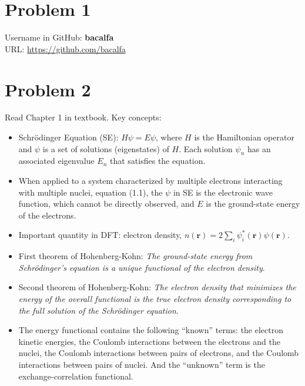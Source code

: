 \documentclass[letter, 12pt]{article}
\begin{document}
\section*{Problem 1}

Username in GitHub: \textbf{bacalfa}\\
URL: \url{https://github.com/bacalfa}




\section*{Problem 2}

Read Chapter 1 in textbook. Key concepts:
\begin{itemize}
	\item Schr\"odinger Equation (SE): $H\psi = E\psi$, where $H$ is the Hamiltonian operator and $\psi$ is a set of solutions (eigenstates) of $H$. Each solution $\psi_n$ has an associated eigenvalue $E_n$ that satisfies the equation.
	
	\item When applied to a system characterized by multiple electrons interacting with multiple nuclei, equation (1.1), the $\psi$ in SE is the electronic wave function, which cannot be directly observed, and $E$ is the ground-state energy of the electrons.
	
	\item Important quantity in DFT: electron density, $n(\mathbf{r}) = 2\sum_i \psi_i^*(\mathbf{r})\psi(\mathbf{r})$.
	
	\item First theorem of Hohenberg-Kohn: \emph{The ground-state energy from Schr\"odinger's equation is a unique functional of the electron density}.
	
	\item Second theorem of Hohenberg-Kohn: \emph{The electron density that minimizes the energy of the overall functional is the true electron density corresponding to the full solution of the Schr\"odinger equation}.
	
	\item The energy functional contains the following ``known'' terms: the electron kinetic energies, the Coulomb interactions between the electrons and the nuclei, the Coulomb interactions between pairs of electrons, and the Coulomb interactions between pairs of nuclei. And the ``unknown'' term is the exchange-correlation functional.
	

\end{itemize}
\end{document}
